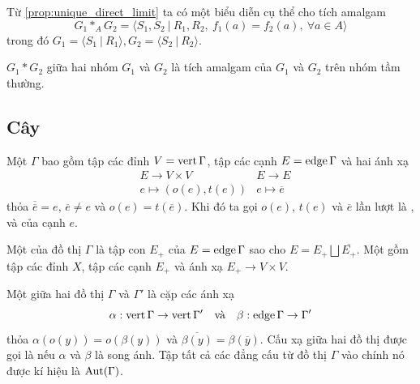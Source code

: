 Từ \ref{prop:unique_direct_limit} ta có một biểu diễn cụ thể cho tích amalgam
$$
    G_1 *_A G_2 = \langle S_1, S_2\ |\ R_1, R_2,\ f_1(a) = f_2(a),\ \forall a \in A \rangle
$$
trong đó $G_1 = \langle S_1\ |\ R_1 \rangle, G_2 = \langle S_2\ |\ R_2 \rangle$.

\begin{define}
     $G_1 * G_2$ giữa hai nhóm $G_1$ và $G_2$ là tích amalgam của $G_1$ và $G_2$ trên nhóm tầm thường.
\end{define}

\subsection{Cây}
\begin{define}
    Một  $\Gamma$ bao gồm tập các đỉnh $V = \operatorname{vert} \Gamma$, tập các cạnh $E = \operatorname{edge} \Gamma$ và hai ánh xạ
    \begin{align*}
         & E \rightarrow  V \times V  & E \rightarrow  E            \\
         & e \mapsto      (o(e),t(e)) & e \mapsto      \overline{e}
    \end{align*}
    thỏa $\overline{\overline{e}} = e$, $\overline{e} \neq e$ và $o(e) = t(\overline{e})$. Khi đó ta gọi $o(e)$, $t(e)$ và $\overline{e}$ lần lượt là ,  và  của cạnh $e$.
\end{define}

\begin{define}
    Một  của đồ thị $\Gamma$ là tập con $E_+$ của $E = \operatorname{edge} \Gamma$ sao cho $E = E_+ \bigsqcup \overline{E_+}$. Một  gồm tập các đỉnh $X$, tập các cạnh $E_+$ và ánh xạ $E_+ \rightarrow V \times V$.
\end{define}

\begin{define}
    Một  giữa hai đồ thị $\Gamma$ và $\Gamma'$ là cặp các ánh xạ
    $$
        \alpha: \operatorname{vert} \Gamma \rightarrow \operatorname{vert}\Gamma'\quad\text{và}\quad \beta: \operatorname{edge} \Gamma \rightarrow \Gamma'
    $$
    thỏa $\alpha(o(y)) = o(\beta(y))$ và $\overline{\beta(y)} = \beta(\overline{y})$. Cấu xạ giữa hai đồ thị được gọi là  nếu $\alpha$ và $\beta$ là song ánh. Tập tất cả các đẳng cấu từ đồ thị $\Gamma$ vào chính nó được kí hiệu là $\operatorname{Aut}(\Gamma)$.
\end{define}

